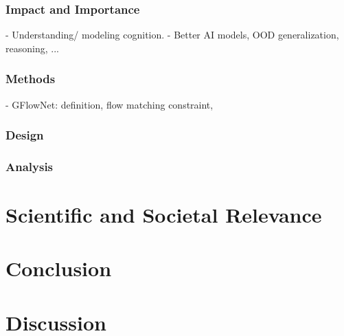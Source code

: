 \documentclass[twocolumn]{article}
\begin{document}
\subsubsection{Impact and Importance}
- Understanding/ modeling cognition. 
- Better AI models, OOD generalization, reasoning, ...

\subsubsection{Methods}
- GFlowNet: definition, flow matching constraint, 

\subsubsection{Design}

\subsubsection{Analysis}


\section{Scientific and Societal Relevance}

\section{Conclusion}

\section{Discussion}

\appendix

\clearpage


\end{document}

